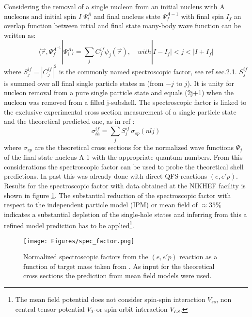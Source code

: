 Considering the removal of a single nucleon from an initial nucleus with A nucleons and initial spin \textit{I} $\Psi^A_i$ and final nucleus state  $\Psi^{A-1}_f$ with final spin $I_f$ an overlap function between intial and final state many-body wave function can be written as:
\begin{equation}
\langle \vec{r}, \Psi_f^{A^{-1}} | \Psi_i^A \rangle = \sum_j C_j^{if} \psi_j(\vec{r}), \quad with  |I - I_f| < j < |I + I_f|
\end{equation}
where $S_j^{if} = |C_j^{if}|^2$ is the commonly named spectroscopic factor, see ref \cite{hansen2003direct} sec.2.1. $S_j^{if}$ is summed over all final single particle states m (from $-j$ to $j$). It is unity for nucleon removal from a pure single particle state and equals (2j+1) when the nucleon was removed from a filled j-subshell.
The spectroscopic factor is linked to the exclusive experimental cross section measurement of a single particle state and the theoretical predicted one, as in ref \cite{hansen2003direct}:
\begin{equation}
\sigma_{th}^{if} = \sum_j S_j^{if}\,\sigma_{sp}(nlj)
\end{equation}
where $\sigma_{sp}$ are the theoretical cross sections for the normalized wave functions $\Psi_j$ of the final state nucleus A-1 with the appropriate quantum numbers.\newline
From this considerations the spectroscopic factor can be used to probe the theoretical shell predictions. In past this was already done with direct QFS-reactions $(e,e'p)$. Results for the spectroscopic factor with data obtained at the NIKHEF facility is shown in figure \ref{fig:spec_fac}. The substantial reduction of the spectroscopic factor with respect to the independent particle model (IPM) or mean field of $\approx 35\%$ indicates a substantial depletion of the single-hole states and inferring from this a refined model prediction has to be applied\footnote{The mean field potential does not consider spin-spin interaction $V_{ss}$, non central tensor-potential $V_T$ or spin-orbit interaction $V_{LS}$.}.\newline
\begin{figure}[h!]
    \centering
    \texttt{[image: Figures/spec\_factor.png]}
    \caption{Normalized spectroscopic factors from the $(e,e'p)$ reaction as a function of target mass taken from \cite{DICKHOFF2004377}. As input for the theoretical cross sections the prediction from mean field models were used. }
    \label{fig:spec_fac}
\end{figure}
